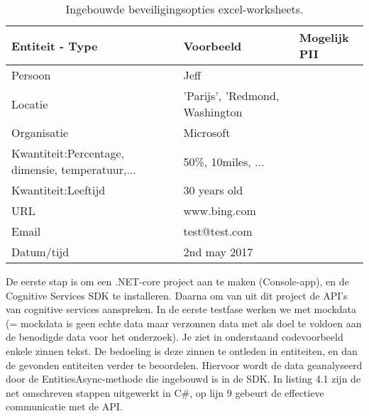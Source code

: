 \begin{table}

	\begin{tabularx}{\linewidth}{ |X|l|l| } 
        	
	\hline
	Entiteit - Type & Voorbeeld & Mogelijk PII \\ [0.5ex]
	
	\hline\hline
	Persoon & Jeff & \checkmark \\ \hline 
	Locatie & 'Parijs', 'Redmond, Washington & \checkmark \\ \hline  
	Organisatie & Microsoft & \checkmark \\ \hline 
	Kwantiteit:Percentage, dimensie, temperatuur,... & 50\%, 10miles, ... & \\ \hline 
	Kwantiteit:Leeftijd & 30 years old & \checkmark \\ \hline 
	URL & www.bing.com & \checkmark \\ \hline 
	Email & test@test.com & \checkmark \\ \hline 
	Datum/tijd & 2nd may 2017 & \\ \hline 
	
	\hline

\end{tabularx}
\caption{Ingebouwde beveiligingsopties excel-worksheets.} 
\end{table}
De eerste stap is om een .NET-core project aan te maken (Console-app), en de Cognitive Services SDK te installeren.  
Daarna om van uit dit project  de API's van cognitive services aanspreken. In de eerste testfase werken we met mockdata (= mockdata is geen echte data maar verzonnen data met als doel te voldoen aan de benodigde data voor het onderzoek). Je ziet in onderstaand codevoorbeeld enkele zinnen tekst. De bedoeling is deze zinnen te ontleden in entiteiten, en dan de gevonden entiteiten verder te beoordelen. 
Hiervoor wordt de data geanalyseerd door de EntitiesAsync-methode die ingebouwd is in de SDK. In listing 4.1 zijn de net omschreven stappen uitgewerkt in C\#, op lijn 9 gebeurt de effectieve communicatie met de API. 

